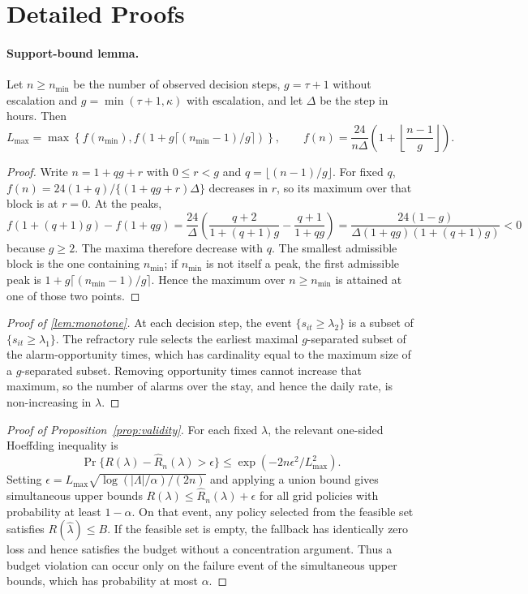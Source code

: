 \section{Detailed Proofs}
\label{sec:supp-proofs}

\paragraph{Support-bound lemma.}
Let $n\ge n_{\min}$ be the number of observed decision steps, $g=\tau+1$ without escalation and $g=\min(\tau+1,\kappa)$ with escalation, and let $\Delta$ be the step in hours. Then
\[
L_{\max}=\max\left\{f(n_{\min}),f(1+g\lceil (n_{\min}-1)/g\rceil)\right\},
\qquad
f(n)=\frac{24}{n\Delta}\left(1+\left\lfloor\frac{n-1}{g}\right\rfloor\right).
\]
\begin{proof}
Write $n=1+qg+r$ with $0\le r<g$ and $q=\lfloor(n-1)/g\rfloor$. For fixed $q$, $f(n)=24(1+q)/\{(1+qg+r)\Delta\}$ decreases in $r$, so its maximum over that block is at $r=0$. At the peaks,
\[
f(1+(q+1)g)-f(1+qg)
=\frac{24}{\Delta}\left(\frac{q+2}{1+(q+1)g}-\frac{q+1}{1+qg}\right)
=\frac{24(1-g)}{\Delta(1+qg)(1+(q+1)g)}<0
\]
because $g\ge2$. The maxima therefore decrease with $q$. The smallest admissible block is the one containing $n_{\min}$; if $n_{\min}$ is not itself a peak, the first admissible peak is $1+g\lceil(n_{\min}-1)/g\rceil$. Hence the maximum over $n\ge n_{\min}$ is attained at one of those two points.
\end{proof}

\begin{proof}[Proof of \cref{lem:monotone}]
At each decision step, the event $\{s_{it}\ge\lambda_2\}$ is a subset of $\{s_{it}\ge\lambda_1\}$. The refractory rule selects the earliest maximal $g$-separated subset of the alarm-opportunity times, which has cardinality equal to the maximum size of a $g$-separated subset. Removing opportunity times cannot increase that maximum, so the number of alarms over the stay, and hence the daily rate, is non-increasing in $\lambda$.
\end{proof}

\begin{proof}[Proof of Proposition~\ref{prop:validity}]
For each fixed $\lambda$, the relevant one-sided Hoeffding inequality is
\begin{equation*}
\Pr\{R(\lambda)-\widehat R_n(\lambda)>\epsilon\}
 \le\exp(-2n\epsilon^2/L_{\max}^2).
\end{equation*}
Setting $\epsilon=L_{\max}\sqrt{\log(|\Lambda|/\alpha)/(2n)}$ and applying a union bound gives simultaneous upper bounds $R(\lambda)\le\widehat R_n(\lambda)+\epsilon$ for all grid policies with probability at least $1-\alpha$. On that event, any policy selected from the feasible set satisfies $R(\widehat\lambda)\le B$. If the feasible set is empty, the fallback has identically zero loss and hence satisfies the budget without a concentration argument. Thus a budget violation can occur only on the failure event of the simultaneous upper bounds, which has probability at most $\alpha$.
\end{proof}

